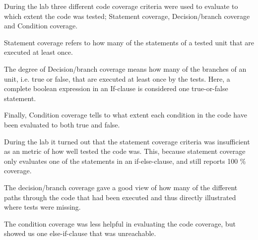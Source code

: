 During the lab three different code coverage criteria were used to evaluate to which extent the code was tested; Statement coverage, Decision/branch coverage and Condition coverage. 

Statement coverage refers to how many of the statements of a tested unit that are executed at least once. 

The degree of Decision/branch coverage means how many of the branches of an unit, i.e. true or false, that are executed at least once by the tests. Here, a complete boolean expression in an If-clause is considered one true-or-false statement. 

Finally, Condition coverage tells to what extent each condition in the code have been evaluated to both true and false. 

During the lab it turned out that the statement coverage criteria was insufficient as an metric of how well tested the code was. This, because statement coverage only evaluates one of the statements in an if-else-clause, and still reports 100 \% coverage. 

The decision/branch coverage gave a good view of how many of the different paths through the code that had been executed and thus directly illustrated where tests were missing. 

The condition coverage was less helpful in evaluating the code coverage, but showed us one else-if-clause that was unreachable. 

